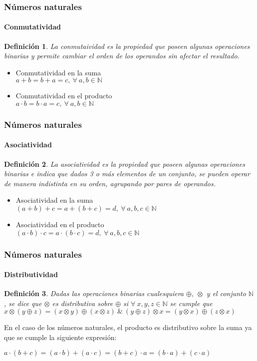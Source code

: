 \documentclass[11pt]{beamer}
\newtheorem{defi}{Definición}
\begin{document}
\begin{frame}
\frametitle{Números naturales}
\framesubtitle{Conmutatividad}
\begin{defi}
La conmutaividad es la propiedad que poseen algunas operaciones binarias y permite cambiar el orden de los operandos
sin afectar el resultado.
\end{defi}
\begin{itemize}
\item Conmutatividad en la suma\\
$a + b = b + a = c,~\forall ~ a,b \in \mathbb{N}$\\ \hspace{2cm}
\item Conmutatividad en el producto\\
$a \cdot b = b \cdot a = c,~\forall ~ a,b \in \mathbb{N}$
\end{itemize}
\end{frame}

\begin{frame}
\frametitle{Números naturales}
\framesubtitle{Asociatividad}
\begin{defi}
La asociatividad es la propiedad que poseen algunas operaciones binarias e indica que dados 3 o más elementos de un conjunto,
se pueden operar de manera indistinta en su orden, agrupando por pares de operandos.
\end{defi}
\begin{itemize}
\item Asociatividad en la suma\\
$(a + b) + c = a + (b + c) = d,~\forall ~ a,b,c \in \mathbb{N}$\\ \hspace{2cm}
\item Asociatividad en el producto\\
$(a \cdot b) \cdot c = a \cdot (b \cdot c) = d,~\forall ~ a,b,c \in \mathbb{N}$
\end{itemize}
\end{frame}

\begin{frame}
\frametitle{Números naturales}
\framesubtitle{Distributividad}
\begin{defi}
Dadas las operaciones binarias cualesquiera $\oplus,~\otimes$ y el conjunto $\mathbb{N}$, se dice que $\otimes$ es distributiva sobre $\oplus$ si $\forall ~ x,y,z \in \mathbb{N}$ se cumple que $x \otimes (y \oplus z) = (x \otimes y) \oplus (x \otimes z)~\&~
(y \oplus z) \otimes x = (y \otimes x) \oplus (z \otimes x)$
\end{defi}
En el caso de los números naturales, el producto es distributivo sobre la suma ya que se cumple la siguiente expresión:
\begin{center}
$a \cdot (b + c) = (a \cdot b) + (a \cdot c) = (b + c) \cdot a = (b \cdot a) + (c \cdot a)$
\end{center}
\end{frame}
\end{document}

